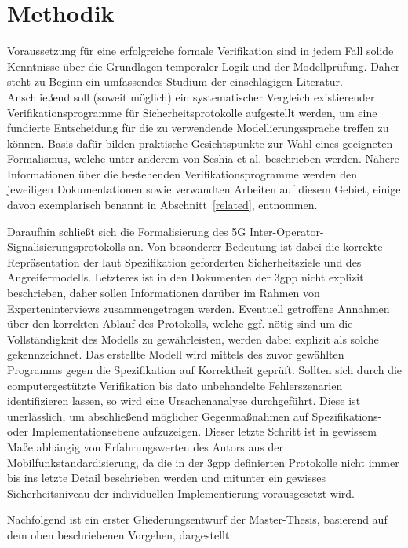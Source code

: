 \section{Methodik}

Voraussetzung für eine erfolgreiche formale Verifikation sind in jedem Fall solide Kenntnisse über die Grundlagen temporaler Logik und der Modellprüfung.
Daher steht zu Beginn ein umfassendes Studium der einschlägigen Literatur.
Anschließend soll (soweit möglich) ein systematischer Vergleich existierender Verifikationsprogramme für Sicherheitsprotokolle aufgestellt werden, um eine fundierte Entscheidung für die zu verwendende Modellierungssprache treffen zu können.
Basis dafür bilden praktische Gesichtspunkte zur Wahl eines geeigneten Formalismus, welche unter anderem von Seshia et al. \cite{seshia2018model} beschrieben werden.
Nähere Informationen über die bestehenden Verifikationsprogramme werden den jeweiligen Dokumentationen sowie verwandten Arbeiten auf diesem Gebiet, einige davon exemplarisch benannt in Abschnitt~\ref{related}, entnommen.

Daraufhin schließt sich die Formalisierung des 5G Inter-Operator-Signalisierungsprotokolls an.
Von besonderer Bedeutung ist dabei die korrekte Repräsentation der laut Spezifikation geforderten Sicherheitsziele und des Angreifermodells.
Letzteres ist in den Dokumenten der \gls{3gpp} nicht explizit beschrieben, daher sollen Informationen darüber im Rahmen von Experteninterviews zusammengetragen werden.
Eventuell getroffene Annahmen über den korrekten Ablauf des Protokolls, welche ggf. nötig sind um die Vollständigkeit des Modells zu gewährleisten, werden dabei explizit als solche gekennzeichnet.
Das erstellte Modell wird mittels des zuvor gewählten Programms gegen die Spezifikation auf Korrektheit geprüft.
Sollten sich durch die computergestützte Verifikation bis dato unbehandelte Fehlerszenarien identifizieren lassen, so wird eine Ursachenanalyse durchgeführt.
Diese ist unerlässlich, um abschließend möglicher Gegenmaßnahmen auf Spezifikations- oder Implementationsebene aufzuzeigen.
Dieser letzte Schritt ist in gewissem Maße abhängig von Erfahrungswerten des Autors aus der Mobilfunkstandardisierung, da die in der \gls{3gpp} definierten Protokolle nicht immer bis ins letzte Detail beschrieben werden und mitunter ein gewisses Sicherheitsniveau der individuellen Implementierung vorausgesetzt wird. 

Nachfolgend ist ein erster Gliederungsentwurf der Master-Thesis, basierend auf dem oben beschriebenen Vorgehen, dargestellt:

